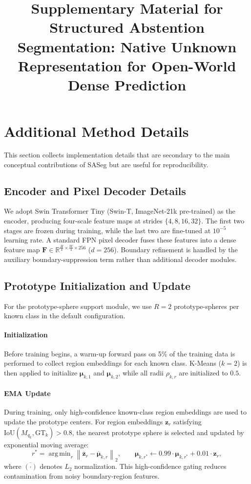 \documentclass[11pt]{article}
\title{Supplementary Material for\\Structured Abstention Segmentation: Native Unknown Representation for Open-World Dense Prediction}
\author{}
\date{}
\newcommand{\R}{\mathbb{R}}
\newcommand{\bF}{\mathbf{F}}
\newcommand{\bz}{\mathbf{z}}
\newcommand{\bmu}{\boldsymbol{\mu}}
\DeclareMathOperator*{\argmin}{arg\,min}
\begin{document}
\maketitle

\section{Additional Method Details}

This section collects implementation details that are secondary to the main conceptual
contributions of SASeg but are useful for reproducibility.

\subsection{Encoder and Pixel Decoder Details}

We adopt Swin Transformer Tiny (Swin-T, ImageNet-21k pre-trained) as the encoder,
producing four-scale feature maps at strides $\{4, 8, 16, 32\}$.
The first two stages are frozen during training, while the last two are fine-tuned at
$10^{-5}$ learning rate.
A standard FPN pixel decoder fuses these features into a dense feature map
$\bF \in \R^{\frac{H}{4} \times \frac{W}{4} \times 256}$ ($d=256$).
Boundary refinement is handled by the auxiliary boundary-suppression term rather than
additional decoder modules.

\subsection{Prototype Initialization and Update}

For the prototype-sphere support module, we use $R=2$ prototype-spheres per known
class in the default configuration.

\paragraph{Initialization}
Before training begins, a warm-up forward pass on 5\% of the training data is
performed to collect region embeddings for each known class.
K-Means ($k=2$) is then applied to initialize $\bmu_{k,1}$ and $\bmu_{k,2}$, while
all radii $\rho_{k,r}$ are initialized to $0.5$.

\paragraph{EMA Update}
During training, only high-confidence known-class region embeddings are used to
update the prototype centers.
For region embeddings $\bz_r$ satisfying
$\text{IoU}(M_{q_k}, \text{GT}_k) > 0.8$, the nearest prototype sphere is selected and
updated by exponential moving average:
\begin{equation}
  r^* = \argmin_{r} \left\|\overline{\bz}_r - \overline{\bmu}_{k,r}\right\|_2, \qquad
  \bmu_{k,r^*} \leftarrow 0.99 \cdot \bmu_{k,r^*} + 0.01 \cdot \bz_r,
\end{equation}
where $\overline{(\cdot)}$ denotes $L_2$ normalization.
This high-confidence gating reduces contamination from noisy boundary-region features.
\end{document}
